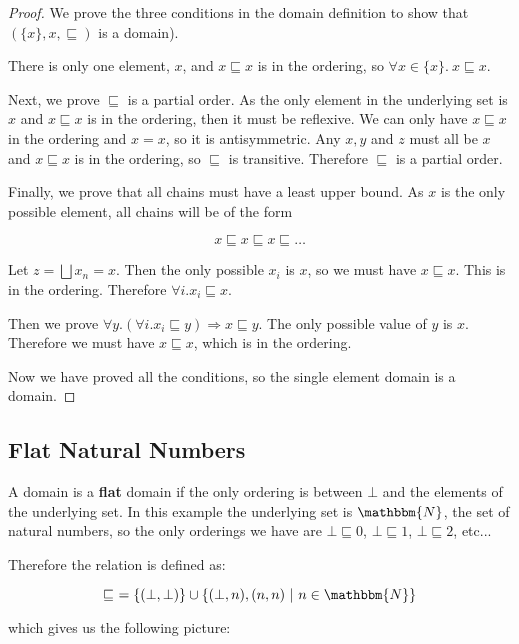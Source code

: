 \begin{proof}
We prove the three conditions in the domain definition to show that $(\{x\},x,\sqsubseteq)$ is a domain).

There is only one element, $x$, and $x \sqsubseteq x$ is in the ordering, so $\forall x \in \{x\}. \ x \sqsubseteq x$.

Next, we prove $\sqsubseteq$ is a partial order. As the only element in the underlying set is $x$ and $x \sqsubseteq x$ is in the ordering, then it must be  reflexive. We can only have $x \sqsubseteq x$ in the ordering and $x = x$, so it is antisymmetric.
Any $x,y$ and $z$ must all be $x$ and $x \sqsubseteq x$ is in the ordering, so $\sqsubseteq$ is transitive. Therefore $\sqsubseteq$ is a partial order.


Finally, we prove that all chains must have a least upper bound. As $x$ is the only possible element, all chains will be of the form 

\[ x \sqsubseteq x  \sqsubseteq x  \sqsubseteq \dots \]

Let $z = \bigsqcup x_n = x$. Then the only possible $x_i$ is $x$, so we must have $x \sqsubseteq x$. This is in the ordering. Therefore $\forall i. x_i \sqsubseteq x$.

Then we prove $\forall y. (\forall i . x_i \sqsubseteq y) \Rightarrow x \sqsubseteq y$. The only possible value of $y$ is $x$. Therefore we must have $x \sqsubseteq x$, which is in the ordering.

\vspace{0.25cm}

Now we have proved all the conditions, so the single element domain is a domain.
\end{proof}

\subsection{Flat Natural Numbers}\label{flat} A domain is a \textbf{flat} domain if  the only ordering is between $\bot$ and the elements of the underlying set. In this example the underlying set is  $\mathbbm{N}$, the set of natural numbers, so the only orderings we have are $\bot \sqsubseteq 0$, $\bot \sqsubseteq 1$, $\bot \sqsubseteq 2$, etc... 

Therefore the relation is defined as:

\[ \sqsubseteq  \ = \{ (\bot , \bot) \} \cup \{ (\bot , n) , (n ,n) \ | \ n \in \mathbbm{N} \} \] 

which gives us the following picture:   

